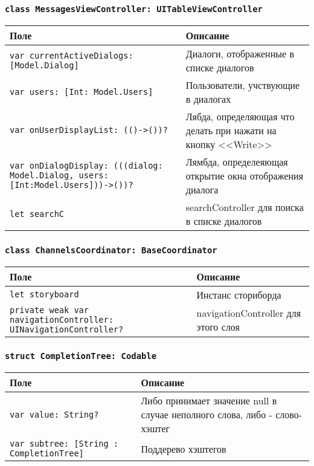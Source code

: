 \subsubsection*{\texttt{class MessagesViewController: UITableViewController}}

\begin{longtable}{| >{\raggedright\arraybackslash}p{} | p{}|}
\hline
\textbf{Поле} & \textbf{Описание} \\ \hline
\texttt{var currentActiveDialogs: [Model.Dialog] } & {Диалоги, отображенные в списке диалогов} \\ \hline
\texttt{var users: [Int: Model.Users] } & {Пользователи, учствующие в диалогах} \\ \hline
\texttt{var onUserDisplayList: (()->())?} & {Лябда, определяющая что делать при нажати на кнопку <<Write>>} \\ \hline
\texttt{var onDialogDisplay: (((dialog: Model.Dialog, users: [Int:Model.Users]))->())?} & {Лямбда, определеяющая открытие окна отображения диалога} \\ \hline
\texttt{let searchC } & {searchController для поиска в списке диалогов} \\ \hline
\end{longtable}

\subsubsection*{\texttt{class ChannelsCoordinator: BaseCoordinator}}

\begin{longtable}{| >{\raggedright\arraybackslash}p{} | p{}|}
\hline
\textbf{Поле} & \textbf{Описание} \\ \hline
\texttt{let storyboard } & {Инстанс сториборда} \\ \hline
\texttt{private weak var navigationController: UINavigationController?} & {navigationController для этого слоя} \\ \hline
\end{longtable}

\subsubsection*{\texttt{struct CompletionTree: Codable}}

\begin{longtable}{| >{\raggedright\arraybackslash}p{} | p{}|}
\hline
\textbf{Поле} & \textbf{Описание} \\ \hline
\texttt{var value: String?} & {Либо принимает значение null в случае неполного слова, либо - слово-хэштег} \\ \hline
\texttt{var subtree: [String : CompletionTree]} & {Поддерево хэштегов} \\ \hline
\end{longtable}

